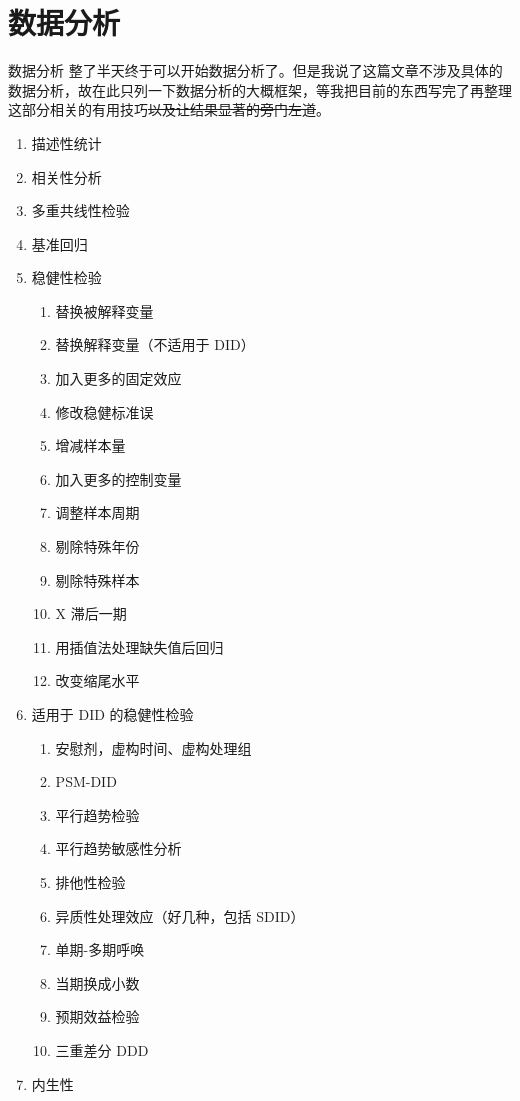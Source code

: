\documentclass[
  ignorenonframetext,
  aspectratio=169,
  fontset=ubuntu]{ctexbeamer}
\providecommand{\tightlist}{%
  \setlength{\itemsep}{0pt}\setlength{\parskip}{0pt}}
\providecommand{\st}[1]{\CJKsout{#1}}
\renewcommand{\st}[1]{\sout{#1}}
\begin{document}
\section{数据分析}\label{ux6570ux636eux5206ux6790}

\begin{frame}[fragile]{数据分析}
整了半天终于可以开始数据分析了。但是我说了这篇文章不涉及具体的数据分析，故在此只列一下数据分析的大概框架，等我把目前的东西写完了再整理这部分相关的有用技巧\st{以及让结果显著的旁门左道}。

\begin{enumerate}
\tightlist
\item
  描述性统计
\item
  相关性分析
\item
  多重共线性检验
\item
  基准回归
\item
  稳健性检验

  \begin{enumerate}
  \tightlist
  \item
    替换被解释变量
  \item
    替换解释变量（不适用于 DID）
  \item
    加入更多的固定效应
  \item
    修改稳健标准误
  \item
    增减样本量
  \item
    加入更多的控制变量
  \item
    调整样本周期
  \item
    剔除特殊年份
  \item
    剔除特殊样本
  \item
    X 滞后一期
  \item
    用插值法处理缺失值后回归
  \item
    改变缩尾水平
  \end{enumerate}
\item
  适用于 DID 的稳健性检验

  \begin{enumerate}
  \tightlist
  \item
    安慰剂，虚构时间、虚构处理组
  \item
    PSM-DID
  \item
    平行趋势检验
  \item
    平行趋势敏感性分析
  \item
    排他性检验
  \item
    异质性处理效应（好几种，包括 SDID）
  \item
    单期-多期呼唤
  \item
    当期换成小数
  \item
    预期效益检验
  \item
    三重差分 DDD
  \end{enumerate}
\item
  内生性


\end{enumerate}
\end{frame}
\end{document}

